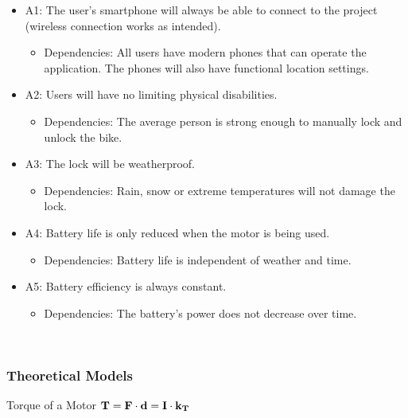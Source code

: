 \documentclass[12pt]{article}
\newcommand{\deftheory}[9][Not Applicable]
{
\newpage
\noindent \rule{\textwidth}{0.5mm}

\paragraph{RefName: } \textbf{#2} \phantomsection 
\label{#2}

\paragraph{Label:} #3

\noindent \rule{\textwidth}{0.5mm}

\paragraph{Equation:}

#4

\paragraph{Description:}

#5

\paragraph{Notes:}

#6

\paragraph{Source:}

#7

\paragraph{Ref.\ By:}

#8

\paragraph{Preconditions for \hyperref[#2]{#2}:}
\label{#2_precond}

#9

\paragraph{Derivation for \hyperref[#2]{#2}:}
\label{#2_deriv}

#1

\noindent \rule{\textwidth}{0.5mm}

}
\begin{document}
\begin{itemize}

\item A1: The user’s smartphone will always be able to connect to the project (wireless connection works as intended).
	\begin {itemize}
		\item Dependencies: All users have modern phones that can operate the application. The phones will also have functional location settings.  
	\end {itemize}
	
\item A2: Users will have no limiting physical disabilities.
	\begin {itemize}
		\item Dependencies: The average person is strong enough to manually lock and unlock the bike.
	\end {itemize}
	
\item A3: The lock will be weatherproof.
	\begin {itemize}
		\item Dependencies: Rain, snow or extreme temperatures will not damage the lock. 
	\end {itemize}
	
\item A4: Battery life is only reduced when the motor is being used.
	\begin {itemize} 
		\item Dependencies: Battery life is independent of weather and time.
	\end {itemize}

\item A5: Battery efficiency is always constant.
	\begin {itemize}
		\item Dependencies: The battery's power does not decrease over time.
	\end {itemize}

\end{itemize}

~\newpage

\subsubsection{Theoretical Models}\label{sec_theoretical}

\noindent
{}
{Torque of a Motor}
{
  ${\bf T = F \cdot d} = {\bf I  \cdot  k_T}$
}
\end{document}
